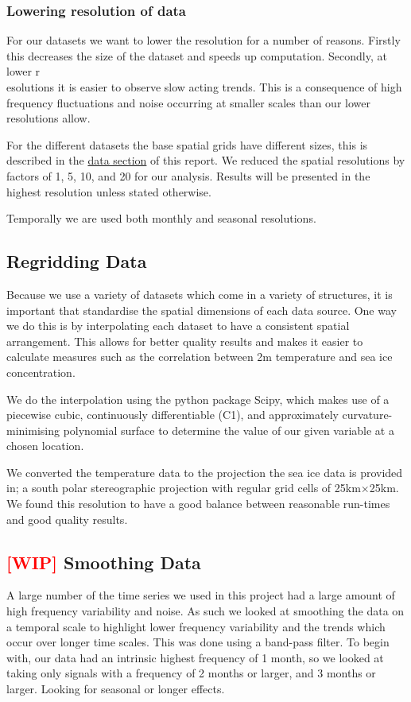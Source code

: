 \subsubsection*{Lowering resolution of data}
For our datasets we want to lower the resolution for a number of reasons. Firstly this decreases the size of the dataset and speeds up computation. Secondly, at lower r\\esolutions it is easier to observe slow acting trends. This is a consequence of high frequency fluctuations and noise occurring at smaller scales than our lower resolutions allow.

For the different datasets the base spatial grids have different sizes, this is described in the \hyperref[chap:data]{data section} of this report. We reduced the spatial resolutions by factors of 1, 5, 10, and 20 for our analysis. Results will be presented in the highest resolution unless stated otherwise.

Temporally we are used both monthly and seasonal resolutions.


\subsection{Regridding Data}
Because we use a variety of datasets which come in a variety of structures, it is important that standardise the spatial dimensions of each data source. One way we do this is by interpolating each dataset to have a consistent spatial arrangement. This allows for better quality results and makes it easier to calculate measures such as the correlation between 2m temperature and sea ice concentration.

We do the interpolation using the python package Scipy, which makes use of a piecewise cubic, continuously differentiable (C1), and approximately curvature-minimising polynomial surface to determine the value of our given variable at a chosen location. 

We converted the temperature data to the projection the sea ice data is provided in; a south polar stereographic projection with regular grid cells of 25km$\times$25km. We found this resolution to have a good balance between reasonable run-times and good quality results.

\subsection{\textcolor{red}{[WIP]} Smoothing Data}
A large number of the time series we used in this project had a large amount of high frequency variability and noise. As such we looked at smoothing the data on a temporal scale to highlight lower frequency variability and the trends which occur over longer time scales. This was done using a band-pass filter. To begin with, our data had an intrinsic highest frequency of 1 month, so we looked at taking only signals with a frequency of 2 months or larger, and 3 months or larger. Looking for seasonal or longer effects.

